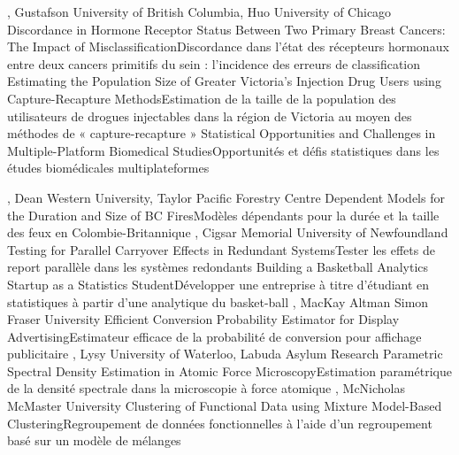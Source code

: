{
,  {Gustafson}
{University of British Columbia},  {Huo}
{University of Chicago}
}
{Discordance in Hormone Receptor Status Between Two Primary Breast Cancers: The Impact of Misclassification}{Discordance dans l'état des récepteurs hormonaux entre deux cancers primitifs du sein : l’incidence des erreurs de classification}
{\bubbleE \enspace \screenE}
{
}
{Estimating the Population Size of Greater Victoria’s Injection Drug Users using Capture-Recapture Methods}{Estimation de la taille de la population des utilisateurs de drogues injectables dans la région de Victoria au moyen des méthodes de « capture-recapture »}
{\bubbleE \enspace \screenE}
{
}
{Statistical Opportunities and Challenges in Multiple-Platform Biomedical Studies}{Opportunités et défis statistiques dans les études biomédicales multiplateformes }
{\bubbleE \enspace \screenE}



{
,  {Dean}
{Western University},  {Taylor}
{Pacific Forestry Centre}
}
{Dependent Models for the Duration and Size of BC Fires}{Modèles dépendants pour la durée et la taille des feux en Colombie-Britannique}
{\bubbleE \enspace \screenE}
{
,  {Cigsar}
{Memorial University of Newfoundland}
}
{Testing for Parallel Carryover Effects in Redundant Systems}{Tester les effets de report parallèle dans les systèmes redondants}
{\bubbleE \enspace \screenE}
{
}
{Building a Basketball Analytics Startup as a Statistics Student}{Développer une entreprise à titre d’étudiant en statistiques à partir d’une analytique du basket-ball }
{\bubbleE \enspace \screenE}
{
,  {MacKay Altman}
{Simon Fraser University}
}
{Efficient Conversion Probability Estimator for Display Advertising}{Estimateur efficace de la probabilité de conversion pour affichage publicitaire}
{\bubbleE \enspace \screenE}
{
,  {Lysy}
{University of Waterloo},  {Labuda}
{Asylum Research}
}
{Parametric Spectral Density Estimation in Atomic Force Microscopy}{Estimation paramétrique de la densité spectrale dans la microscopie à force atomique}
{\bubbleE \enspace \screenE}
{
,  {McNicholas}
{McMaster University}
}
{Clustering of Functional Data using Mixture Model-Based Clustering}{Regroupement de données fonctionnelles à l’aide d’un regroupement basé sur un modèle de mélanges}
{\bubbleE \enspace \screenE}


